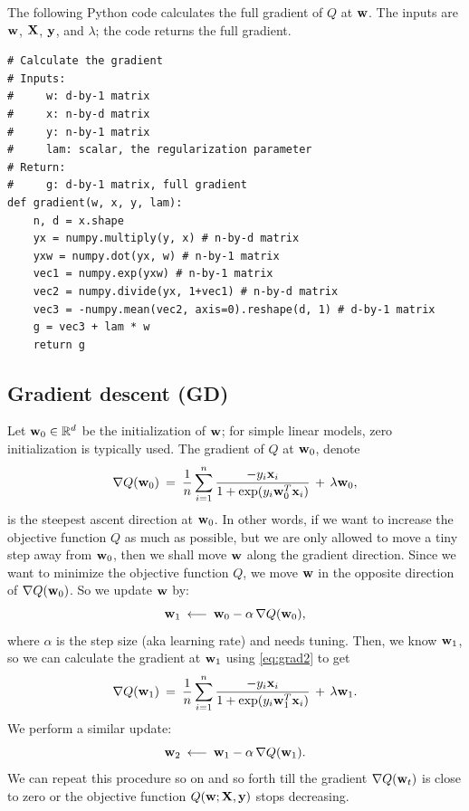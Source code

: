 \documentclass[11pt]{article}
\numberwithin{equation}{section}
\def\w{{\bf w}}
\def\X{{\bf X}}
\def\x{{\bf x}}
\def\y{{\bf y}}
\def\RB{{\mathbb R}}
\begin{document}
The following Python code calculates the full gradient of $Q $ at $\w$.
The inputs are $\w$, $\X$, $\y$, and $\lambda$; the code returns the full gradient.

\vspace{3mm}
\begin{lstlisting}
# Calculate the gradient
# Inputs:
#     w: d-by-1 matrix
#     x: n-by-d matrix
#     y: n-by-1 matrix
#     lam: scalar, the regularization parameter
# Return:
#     g: d-by-1 matrix, full gradient
def gradient(w, x, y, lam):
	n, d = x.shape
	yx = numpy.multiply(y, x) # n-by-d matrix
	yxw = numpy.dot(yx, w) # n-by-1 matrix
	vec1 = numpy.exp(yxw) # n-by-1 matrix
	vec2 = numpy.divide(yx, 1+vec1) # n-by-d matrix
	vec3 = -numpy.mean(vec2, axis=0).reshape(d, 1) # d-by-1 matrix
	g = vec3 + lam * w
	return g
\end{lstlisting}
\vspace{3mm}



\subsection{Gradient descent (GD)}

Let $\w_0 \in \RB^d$ be the initialization of $\w$;
for simple linear models, zero initialization is typically used.
The gradient of $Q$ at $\w_0$, denote 
\begin{equation*}
\nabla Q (\w_0)
\: = \: \frac{1}{n} \sum_{i=1}^n \frac{ - y_i \x_i }{1+\exp({y_i \w_0^T \x_i})} \, + \, \lambda \w_0 ,
\end{equation*} 
is the steepest ascent direction at $\w_0$.
In other words, if we want to increase the objective function $Q$ as much as possible, but we are only allowed to move a tiny step away from $\w_0$, then we shall move $\w$ along the gradient direction.
Since we want to minimize the objective function $Q$, we move $\w$ in the opposite direction of $\nabla Q (\w_0)$.
So we update $\w$ by:
\begin{equation*}
\w_1 \: \longleftarrow \:
\w_0 - \alpha \, \nabla Q (\w_0),
\end{equation*}
where $\alpha$ is the step size (aka learning rate) and needs tuning.
Then, we know $\w_1$, so we can calculate the gradient at $\w_1$ using \eqref{eq:grad2} to get 
\begin{equation*}
\nabla Q (\w_1)
\: = \: \frac{1}{n} \sum_{i=1}^n \frac{ - y_i \x_i }{1+\exp({y_i \w_1^T \x_i})} \, + \, \lambda \w_1 .
\end{equation*} 
We perform a similar update:
\begin{equation*}
\w_2 \: \longleftarrow \:
\w_1 - \alpha \, \nabla Q (\w_1).
\end{equation*}
We can repeat this procedure so on and so forth till the gradient $\nabla Q (\w_t)$ is close to zero or the objective function $Q (\w; \X, \y)$ stops decreasing.
\end{document}
